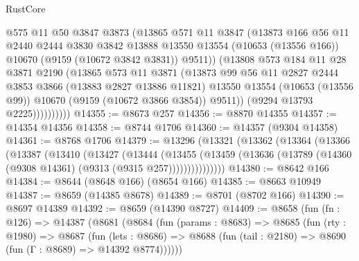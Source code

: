 \begin{lexlean}{RustCore}
\begin{coremodule}
                    @575
                    @11
                    @50
                    @3847
                    @3873
                    (@13865
                      @571
                      @11
                      @3847
                      (@13873
                        @166
                        @56
                        @11
                        @2440
                        @2444
                        @3830
                        @3842
                        @13888
                        @13550
                        @13554
                        (@10653 (@13556 @166))
                        @10670
                        (@9159 (@10672 @3842 @3831))
                        @9511))
                    (@13808
                      @573
                      @184
                      @11
                      @28
                      @3871
                      @2190
                      (@13865
                        @573
                        @11
                        @3871
                        (@13873
                          @99
                          @56
                          @11
                          @2827
                          @2444
                          @3853
                          @3866
                          (@13883 @2827 @13886 @11821)
                          @13550
                          @13554
                          (@10653 (@13556 @99))
                          @10670
                          (@9159 (@10672 @3866 @3854))
                          @9511))
                      (@9294 @13793 @2225))))))))))
@14355 := @8673 @257
@14356 := @8870 @14355
@14357 := @14354 @14356
@14358 := @8744 @1706
@14360 := @14357 (@9304 @14358)
@14361 := @8768 @1706
@14379 := @13296
    (@13321
      (@13362
        (@13364
          (@13366
            (@13387
              (@13410
                (@13427
                  (@13444
                    (@13455
                      (@13459
                        (@13636 (@13789 (@14360 (@9308 @14361) (@9313 (@9315 @257)))))))))))))))
@14380 := @8642 @166
@14384 := @8644 (@8648 @166) (@8654 @166)
@14385 := @8663 @10949
@14387 := @8659 (@14385 @8678)
@14389 := @8701 (@8702 @166)
@14390 := @8697 @14389
@14392 := @8659 (@14390 @8727)
@14409 := @8658
    (fun (fn : @126) =>
    @14387
      (@8681
        (@8684
          (fun (params : @8683) =>
          @8685
            (fun (rty : @1980) =>
            @8687
              (fun (lets : @8686) =>
              @8688 (fun (tail : @2180) => @8690 (fun (Γ : @8689) => @14392 @8774))))))

\end{coremodule}
\end{lexlean}
